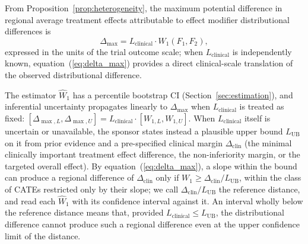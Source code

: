\documentclass[AMA,Times1COL]{WileyNJDv5}
\begin{document}
From Proposition~\ref{prop:heterogeneity}, the maximum potential difference in regional average treatment effects attributable to effect modifier distributional differences is
\begin{equation}
\Delta_{\max} = L_{\text{clinical}} \cdot W_1(F_1, F_2),
\label{eq:delta_max}
\end{equation}
expressed in the units of the trial outcome scale; when $L_{\text{clinical}}$ is independently known, equation~(\ref{eq:delta_max}) provides a direct clinical-scale translation of the observed distributional difference.

The estimator $\widehat{W}_1$ has a percentile bootstrap CI (Section~\ref{sec:estimation}), and inferential uncertainty propagates linearly to $\Delta_{\max}$ when $L_{\text{clinical}}$ is treated as fixed: $[\Delta_{\max,L}, \Delta_{\max,U}] = L_{\text{clinical}} \cdot [W_{1,L}, W_{1,U}]$. When $L_{\text{clinical}}$ itself is uncertain or unavailable, the sponsor states instead a plausible upper bound $L_{\text{UB}}$ on it from prior evidence and a pre-specified clinical margin $\Delta_{\text{clin}}$ (the minimal clinically important treatment effect difference, the non-inferiority margin, or the targeted overall effect). By equation~(\ref{eq:delta_max}), a slope within the bound can produce a regional difference of $\Delta_{\text{clin}}$ only if $W_1 \geq \Delta_{\text{clin}} / L_{\text{UB}}$, within the class of CATEs restricted only by their slope; we call $\Delta_{\text{clin}} / L_{\text{UB}}$ the reference distance, and read each $\widehat{W}_1$ with its confidence interval against it. An interval wholly below the reference distance means that, provided $L_{\text{clinical}} \leq L_{\text{UB}}$, the distributional difference cannot produce such a regional difference even at the upper confidence limit of the distance.
\end{document}
